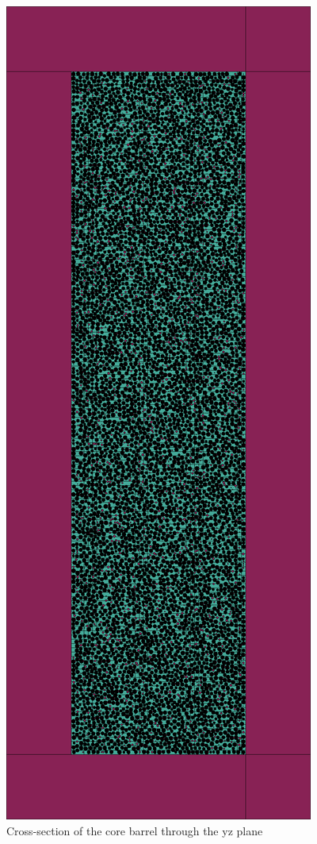\documentclass{anstrans}
\begin{document}
\begin{figure}[H]
  \centering
  \includegraphics[width = \linewidth]{htgr-mr-full-core-axial}
  \caption{Cross-section of the core barrel through the yz plane}
  \label{fig:axial-xs}
\end{figure}
\end{document}
